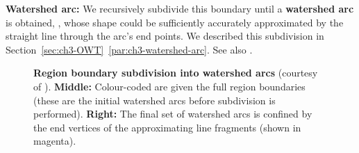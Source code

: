 \textbf{Watershed arc:} We recursively subdivide this boundary until a \textbf{watershed arc} is obtained, , whose shape could be sufficiently accurately approximated by the straight line through the arc's end points. We described this subdivision in Section~\ref*{sec:ch3-OWT}~\ref{par:ch3-watershed-arc}. See also .

\begin{figure}[ht!]
 \centering
 \caption[Region boundary subdivision into watershed arcs]{{\bf Region boundary subdivision into {\bf watershed arcs}} (courtesy of \cite{Arbelaez09}). {\bf Middle:} Colour-coded are given the full region boundaries (these are the initial watershed arcs before subdivision is performed). {\bf Right:} The final set of watershed arcs is confined by %
 the end vertices of the approximating line fragments (shown in magenta).}
 \label{fig:Arbelaez09-watershed-arcs}
\end{figure}

